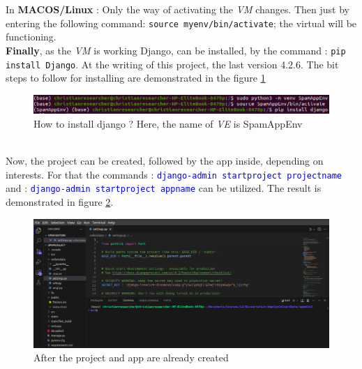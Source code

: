 \documentclass[12pt,a4paper, oneside]{book}
\begin{document}
  In \textbf{MACOS/Linux} : Only the way of activating the \textit{VM} changes. Then just by entering the following command:\newline
  \texttt{source myenv/bin/activate}; the virtual will be functioning. \\
  
   \textbf{Finally}, as the \textit{VM} is working Django, can be installed, by the command :  \texttt{pip install Django}. At the writing of this project, the last version 4.2.6. The bit steps to follow for installing are demonstrated in the figure \ref{fig:installdjango}
\begin{figure}
	\centering
	\includegraphics[width=1\linewidth]{installDjango}
	\caption{How to install django ? Here, the name of \textit{VE} is SpamAppEnv}
	\label{fig:installdjango}
\end{figure}
\\
 Now, the project can be created, followed by the app inside, depending on interests. For that the commands  : \textcolor{blue}{ \texttt{django-admin startproject projectname}} and : \textcolor{blue}{\texttt{django-admin startproject appname}} can be utilized. The result is demonstrated in figure \ref{fig:visualstudio}. 
\begin{figure}
	\centering
	\includegraphics[width=1\linewidth]{visualStudio}
	\caption{After the project and app are already created}
	\label{fig:visualstudio}
\end{figure} 
 \\
 
\end{document}
